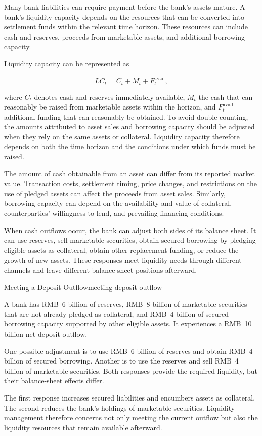 Many bank liabilities can require payment before the bank's assets mature. A bank's liquidity capacity depends on the resources that can be converted into settlement funds within the relevant time horizon. These resources can include cash and reserves, proceeds from marketable assets, and additional borrowing capacity.

Liquidity capacity can be represented as

\begin{equation}
LC_t=C_t+M_t+F_t^{\mathrm{avail}},
\label{eq:ch12-liquidity-capacity}
\end{equation}

where $C_t$ denotes cash and reserves immediately available, $M_t$ the cash that can reasonably be raised from marketable assets within the horizon, and $F_t^{\mathrm{avail}}$ additional funding that can reasonably be obtained. To avoid double counting, the amounts attributed to asset sales and borrowing capacity should be adjusted when they rely on the same assets or collateral. Liquidity capacity therefore depends on both the time horizon and the conditions under which funds must be raised.

The amount of cash obtainable from an asset can differ from its reported market value. Transaction costs, settlement timing, price changes, and restrictions on the use of pledged assets can affect the proceeds from asset sales. Similarly, borrowing capacity can depend on the availability and value of collateral, counterparties' willingness to lend, and prevailing financing conditions.

When cash outflows occur, the bank can adjust both sides of its balance sheet. It can use reserves, sell marketable securities, obtain secured borrowing by pledging eligible assets as collateral, obtain other replacement funding, or reduce the growth of new assets. These responses meet liquidity needs through different channels and leave different balance-sheet positions afterward.

\begin{example}{Meeting a Deposit Outflow}{meeting-deposit-outflow}

A bank has RMB~6 billion of reserves, RMB~8 billion of marketable securities that are not already pledged as collateral, and RMB~4 billion of secured borrowing capacity supported by other eligible assets. It experiences a RMB~10 billion net deposit outflow.

One possible adjustment is to use RMB~6 billion of reserves and obtain RMB~4 billion of secured borrowing. Another is to use the reserves and sell RMB~4 billion of marketable securities. Both responses provide the required liquidity, but their balance-sheet effects differ.

The first response increases secured liabilities and encumbers assets as collateral. The second reduces the bank's holdings of marketable securities. Liquidity management therefore concerns not only meeting the current outflow but also the liquidity resources that remain available afterward.

\end{example}

